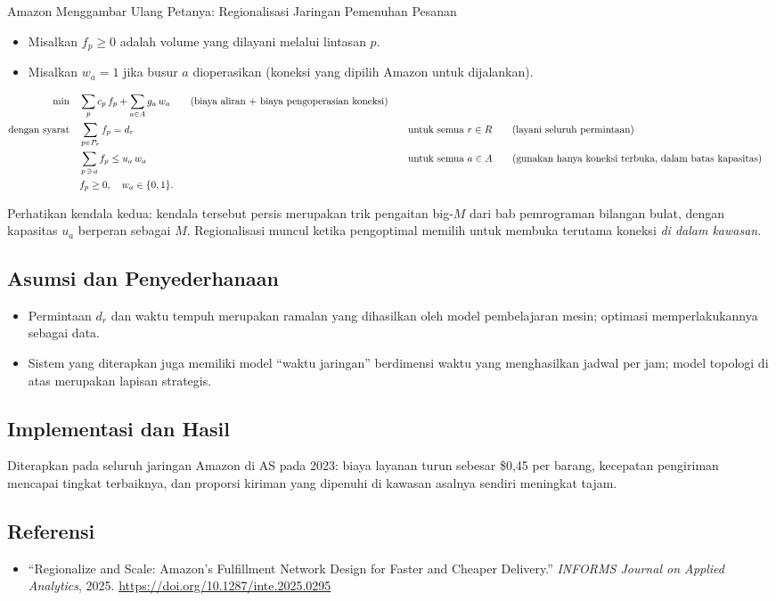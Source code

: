 \begin{casestudybox}{Amazon Menggambar Ulang Petanya: Regionalisasi Jaringan Pemenuhan Pesanan}
\begin{itemize}
\item Misalkan $f_p \geq 0$ adalah volume yang dilayani melalui lintasan $p$.
\item Misalkan $w_a = 1$ jika busur $a$ dioperasikan (koneksi yang dipilih Amazon untuk dijalankan).
\end{itemize}

\begin{align*}
\min \quad & \sum_{p} c_p\, f_p + \sum_{a \in A} g_a\, w_a   \tag{biaya aliran + biaya pengoperasian koneksi} \\
\mbox{dengan syarat}\quad        & \sum_{p \in P_r} f_p = d_r &&\quad \mbox{untuk semua } r \in R   \tag{layani seluruh permintaan} \\
           & \sum_{p \,\ni\, a} f_p \leq u_a\, w_a &&\quad \mbox{untuk semua } a \in A   \tag{gunakan hanya koneksi terbuka, dalam batas kapasitas} \\
           & f_p \geq 0, \quad w_a \in \{0,1\}.
\end{align*}

Perhatikan kendala kedua: kendala tersebut persis merupakan trik pengaitan big-$M$ dari bab pemrograman bilangan bulat, dengan kapasitas $u_a$ berperan sebagai $M$. Regionalisasi muncul ketika pengoptimal memilih untuk membuka terutama koneksi \emph{di dalam kawasan}.

\subsection*{Asumsi dan Penyederhanaan}
\begin{itemize}
\item Permintaan $d_r$ dan waktu tempuh merupakan ramalan yang dihasilkan oleh model pembelajaran mesin; optimasi memperlakukannya sebagai data.
\item Sistem yang diterapkan juga memiliki model ``waktu jaringan'' berdimensi waktu yang menghasilkan jadwal per jam; model topologi di atas merupakan lapisan strategis.
\end{itemize}

\subsection*{Implementasi dan Hasil}
Diterapkan pada seluruh jaringan Amazon di AS pada 2023: biaya layanan turun sebesar \$0,45 per barang, kecepatan pengiriman mencapai tingkat terbaiknya, dan proporsi kiriman yang dipenuhi di kawasan asalnya sendiri meningkat tajam.

\subsection*{Referensi}
\begin{itemize}
\item ``Regionalize and Scale: Amazon's Fulfillment Network Design for Faster and Cheaper Delivery.'' \emph{INFORMS Journal on Applied Analytics}, 2025. \url{https://doi.org/10.1287/inte.2025.0295}
\end{itemize}
\end{casestudybox}

